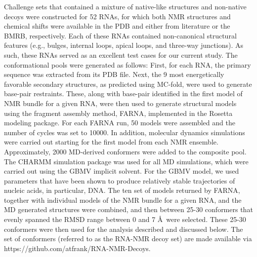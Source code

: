 \documentclass[journal=jcisd8,manuscript=article,layout=onecolumn]{achemso}
\begin{document}
Challenge sets that contained a mixture of native-like structures and non-native decoys  were constructed for 52 RNAs, for which both NMR structures and chemical shifts were available in the PDB\cite{bernstein1977protein}  and either from literature or the BMRB\cite{ulrich2008biomagresbank}, respectively. Each of these RNAs contained non-canonical structural features (e.g., bulges, internal loops, apical loops, and three-way junctions). As such, these RNAs served as an excellent test cases for our current study.  The conformational pools were generated as follows: First, for each RNA, the primary sequence was extracted from its PDB file. Next, the 9 most energetically favorable secondary structures, as predicted using MC-fold\cite{parisien2008mc}, were used to generate base-pair restraints. These, along with base-pair identified in the first model of NMR bundle for a given RNA, were then used to generate structural models using the fragment assembly method, FARNA\cite{das2007automated}, implemented in the Rosetta modeling package\cite{}. For each FARNA run, 50 models were assembled and the number of cycles was set to 10000.  In addition, molecular dynamics simulations were carried out starting for the first model from each NMR ensemble. Approximately, 2000 MD-derived conformers were added to the composite pool. The CHARMM simulation package\cite{brooks1983charmm} was used for all MD simulations, which were carried out using the GBMV implicit solvent\cite{lee2002novel, lee2003new}. For the GBMV model, we used parameters that have been shown to produce relatively stable trajectories of nucleic acids, in particular, DNA\cite{chocholouvsova2006implicit}. The ten set of models returned by FARNA, together with individual models of the NMR bundle for a given RNA, and the MD generated structures were combined, and then between 25-30 conformers that evenly spanned the RMSD range between 0 and 7 \AA\  were selected. These 25-30 conformers were then used for the analysis described and discussed below. The set of conformers (referred to as the RNA-NMR decoy set) are made available via https://github.com/atfrank/RNA-NMR-Decoys.
\end{document}
